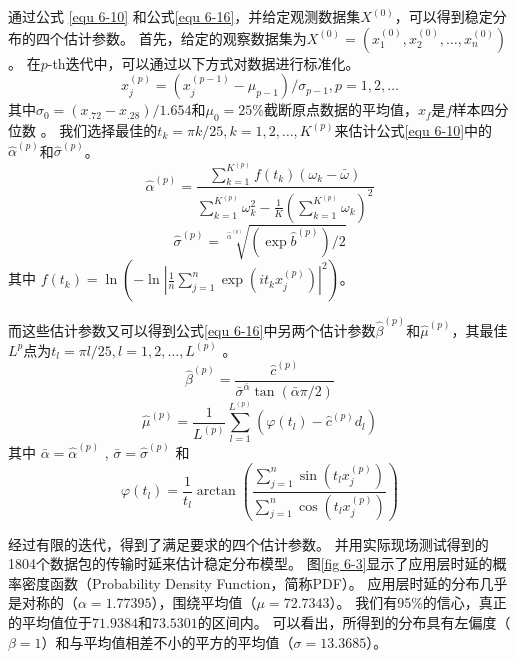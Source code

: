通过公式 \ref{equ 6-10} 和公式\ref{equ 6-16}，并给定观测数据集$X^{(0)}$，可以得到稳定分布的四个估计参数。
首先，给定的观察数据集为$X^{(0)}=(x_1^{(0)}, x_2^{(0)}, \ldots, x_n^{(0)})$。
在$p$-th迭代中，可以通过以下方式对数据进行标准化。
\begin{equation}
x_{j}^{(p)}=\left(x_{j}^{(p-1)}-\mu_{p-1}\right) / \sigma_{p-1}, p = 1,2,\ldots
\end{equation}
其中${\sigma_{0}=\left(x_{.72}-x_{.28}\right) / 1.654}$和$\mu_{0}=25 \%$截断原点数据的平均值，$x_{f}$是$f$样本四分位数 \cite{fama1971parameter}。
我们选择最佳的$t_{k}=\pi k / 25, k=1,2,\ldots,K^{(p)}$\cite{koutrouvelis1980regression}来估计公式\ref{equ 6-10}中的$\hat{\alpha}^{(p)}$和$\hat{\sigma}^{(p)}$。
\begin{equation}
	{\hat{\alpha}^{(p)}=\frac{ \sum_{k=1}^{K^{(p)}} f\left(t_{k}\right)\left(\omega_{k}-\bar{\omega}\right)}{\sum_{k=1}^{K^{(p)}} \omega_{k}^{2}-\frac{1}{K}\left(\sum_{k=1}^{K^{(p)}} \omega_{k}\right)^{2}} } 
\end{equation}
\begin{equation}
	{\hat{\sigma}^{(p)}=\sqrt[\hat{\alpha}^{(p)}]{ (\exp \hat{b}^{(p)}) / 2}}
\end{equation}
其中 $f\left(t_{k}\right) = \ln \left(-\ln \left|\frac{1}{n} \sum_{j=1}^{n} \exp \left(i t_{k} x_{j}^{(p)}\right)\right|^{2}\right)$。

而这些估计参数又可以得到公式\ref{equ 6-16}中另两个估计参数$\hat{\beta}^{(p)}$和$\hat{\mu}^{(p)}$，其最佳$L^{p}$点为$t_{l}=\pi l / 25, l=1,2,\ldots,L^{(p)}$ \cite{koutrouvelis1980regression}。
\begin{equation}
\hat{\beta}^{(p)}= \frac{\hat{c}^{(p)}}{\bar{\sigma}^{\bar{\alpha}} \tan (\bar{\alpha} \pi / 2)}
\end{equation}
\begin{equation}
\hat{\mu}^{(p)}= \frac{1}{L^{(p)}} \sum_{l=1}^{L^{(p)}}\left(\varphi\left(t_{l}\right)-\hat{c}^{(p)} d_{l}\right)
\end{equation}
其中 $\bar{\alpha} =  {\hat{\alpha}^{(p)}}$ , $\bar{\sigma} =  {\hat{\sigma}^{(p)}}$ 和 
\begin{equation}
\varphi\left(t_{l}\right) = \frac{1}{t_{l}} \arctan \left(\frac{ \sum_{j=1}^{n} \sin \left(t_l x_{j}^{(p)}\right)}{\sum_{j=1}^{n} \cos \left(t_l x_{j}^{(p)}\right)}\right)
\end{equation}

经过有限的迭代，得到了满足要求的四个估计参数。
并用实际现场测试得到的1804个数据包的传输时延来估计稳定分布模型。
图\ref{fig 6-3}显示了应用层时延的概率密度函数（Probability Density Function，简称PDF）。
应用层时延的分布几乎是对称的（$\alpha = 1.77395$），围绕平均值（$\mu = 72.7343$）。
我们有95\%的信心，真正的平均值位于$71.9384$和$73.5301$的区间内。
可以看出，所得到的分布具有左偏度（$\beta = 1$）和与平均值相差不小的平方的平均值（$\sigma = 13.3685$）。

